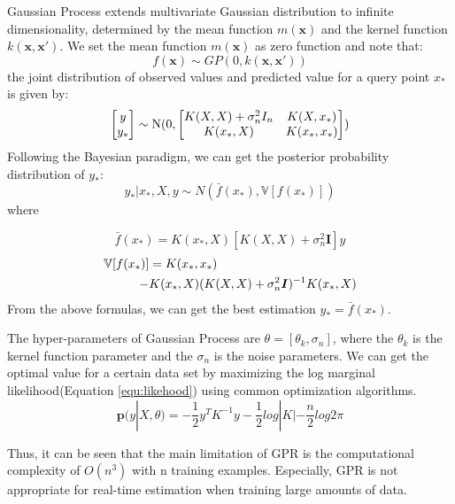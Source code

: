 \documentclass[twoside,leqno,twocolumn]{article}
\begin{document}
Gaussian Process extends multivariate Gaussian distribution to infinite dimensionality, determined by the mean function $m(\bm{x})$ and the kernel function $k(\bm{x},\bm{x}')$. We set the mean function $m(\bm{x})$ as zero function and note that:
\begin{equation}
 f(\bm{x}) \sim GP(0, k(\bm{x}, \bm{x}'))
\end{equation}
the joint distribution of observed values and predicted value for a query point $x_*$ is given by:
\begin{equation}
    \left[ {\begin{matrix}
	  	y\\
	  	y_*
	 \end{matrix}} \right]
   \sim
   {\rm N}(0,\left[ {\begin{matrix}
	  {K(X,X) + \sigma _n^2{I_n}}&{K(X,{x_*})}\\
	  {K({x_*},X)}&{K({x_*},{x_*})}
	 \end{matrix}} \right])
\end{equation}
Following the Bayesian paradigm, we can get the posterior probability distribution of $y_*$:
\[
 y_*|x_*,X,y \sim N(\bar{f}(x_*), \mathbb{V}[f(x_*)])
\]
where

\[
 \bar{f}(x_*)=K(x_*, X)[K(X,X)+\sigma_n^2\bm{I}]y
\]
\begin{equation}
\begin{aligned}
 \mathbb{V}[f(x_*)]&=K(x_*, x_*) \\ \notag
 -&K(x_*, X)(K(X,X)+\sigma_n^2\bm{I})^{-1}K(x_*, X)
\end{aligned}
\end{equation}
From the above formulas, we can get the best estimation $y_*=\bar{f}(x_*)$.

The hyper-parameters of Gaussian Process are $\theta=[\theta_k, \sigma_n]$, where the $\theta_k$ is the kernel function parameter and the $\sigma_n$ is the noise parameters. We can get the optimal value for a certain data set by maximizing the log marginal likelihood(Equation \ref{equ:likehood}) using common optimization algorithms.
\begin{equation}
\label{equ:likehood}
\bm{p}(y|X,\theta)=-\frac{1}{2}y^TK^{-1}y-\frac{1}{2}log|K|-\frac{n}{2}log2\pi
\end{equation}

Thus, it can be seen that the main limitation of GPR is the computational complexity of $O(n^3)$ with n training examples. Especially, GPR is not appropriate for real-time estimation when training large amounts of data.
\end{document}
